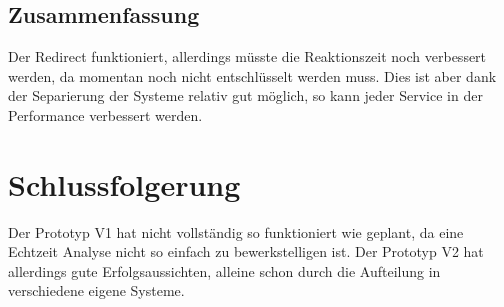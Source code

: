 \subsection{Zusammenfassung}
Der Redirect funktioniert, allerdings müsste die Reaktionszeit noch verbessert werden, da momentan noch nicht entschlüsselt werden muss.
Dies ist aber dank der Separierung der Systeme relativ gut möglich, so kann jeder Service in der Performance verbessert werden.


\section{Schlussfolgerung}
Der Prototyp V1 hat nicht vollständig so funktioniert wie geplant, da eine Echtzeit Analyse nicht so einfach zu bewerkstelligen ist.
Der Prototyp V2 hat allerdings gute Erfolgsaussichten, alleine schon durch die Aufteilung in verschiedene eigene Systeme.




